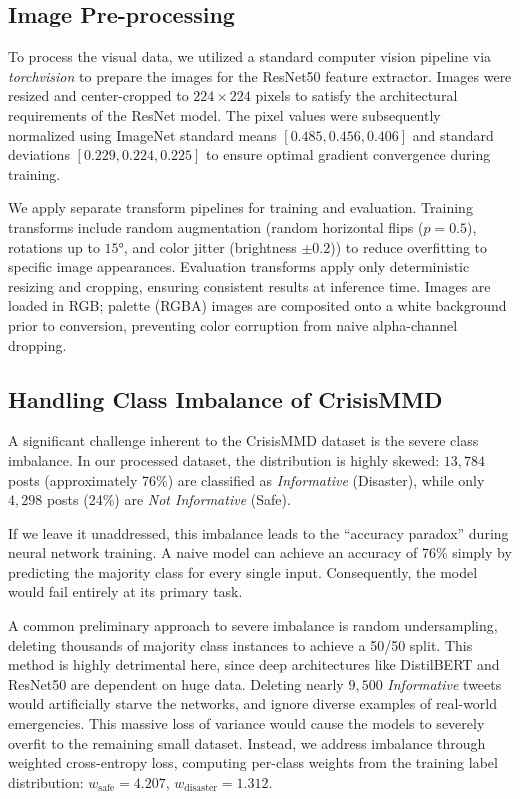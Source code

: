\documentclass[11pt,letterpaper]{article}
\begin{document}
\subsection{Image Pre-processing}
To process the visual data, we utilized a standard computer vision pipeline via \textit{torchvision} to prepare the images for the ResNet50 \cite{resnet50} feature extractor. Images were resized and center-cropped to $224\times224$ pixels to satisfy the architectural requirements of the ResNet model. The pixel values were subsequently normalized using ImageNet standard means $[0.485, 0.456, 0.406]$ and standard deviations $[0.229, 0.224, 0.225]$ to ensure optimal gradient convergence during training.

We apply separate transform pipelines for training and evaluation. Training transforms include random augmentation (random horizontal flips ($p=0.5$), rotations up to $15°$, and color jitter (brightness $\pm 0.2$)) to reduce overfitting to specific image appearances. Evaluation transforms apply only deterministic resizing and cropping, ensuring consistent results at inference time. Images are loaded in RGB; palette (RGBA) images are composited onto a white background prior to conversion, preventing color corruption from naive alpha-channel dropping.

\subsection{Handling Class Imbalance of CrisisMMD}
A significant challenge inherent to the CrisisMMD dataset is the severe class imbalance. In our processed dataset, the distribution is highly skewed: $13,784$ posts (approximately 76\%) are classified as \textit{Informative} (Disaster), while only $4,298$ posts (24\%) are \textit{Not Informative} (Safe).

If we leave it unaddressed, this imbalance leads to the ``accuracy paradox'' during neural network training. A naive model can achieve an accuracy of 76\% simply by predicting the majority class for every single input. Consequently, the model would fail entirely at its primary task.

A common preliminary approach to severe imbalance is random undersampling, deleting thousands of majority class instances to achieve a 50/50 split. This method is highly detrimental here, since deep architectures like DistilBERT and ResNet50 are dependent on huge data. Deleting nearly $9,500$ \textit{Informative} tweets would artificially starve the networks, and ignore diverse examples of real-world emergencies. This massive loss of variance would cause the models to severely overfit to the remaining small dataset. Instead, we address imbalance through weighted cross-entropy loss, computing per-class weights from the training label distribution: $w_\text{safe} = 4.207$, $w_\text{disaster} = 1.312$.
\end{document}
